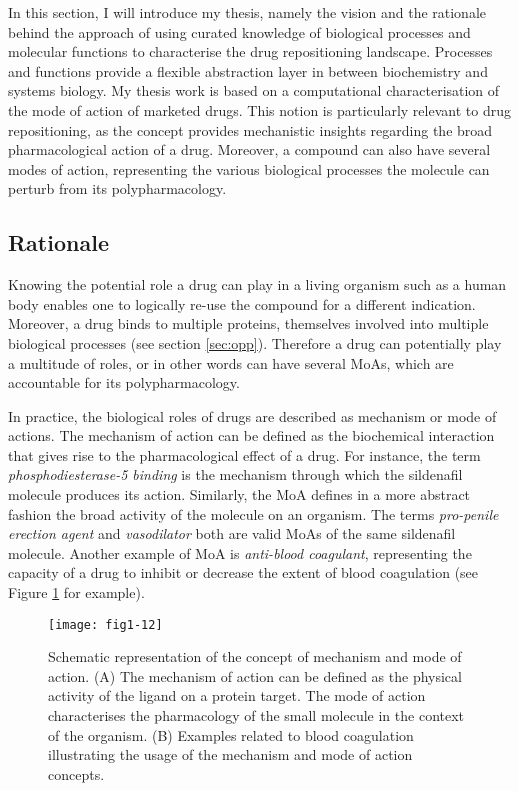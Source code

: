 In this section, I will introduce my thesis, namely the vision and the rationale behind the approach of using curated knowledge of biological processes and molecular functions to characterise the drug repositioning landscape. Processes and functions provide a flexible abstraction layer in between biochemistry and systems biology. My thesis work is based on a computational characterisation of the mode of action of marketed drugs. This notion is particularly relevant to drug repositioning, as the concept provides mechanistic insights regarding the broad pharmacological action of a drug. Moreover, a compound can also have several modes of action, representing the various biological processes the molecule can perturb from its polypharmacology.

\subsection{Rationale}

Knowing the potential role a drug can play in a living organism such as a human body enables one to logically re-use the compound for a different indication. Moreover, a drug binds to multiple proteins, themselves involved into multiple biological processes (see section \ref{sec:opp}). Therefore a drug can potentially play a multitude of roles, or in other words can have several MoAs, which are accountable for its polypharmacology.

In practice, the biological roles of drugs are described as mechanism or mode of actions. The mechanism of action can be defined as the biochemical interaction that gives rise to the pharmacological effect of a drug. For instance, the term \emph{phosphodiesterase-5 binding} is the mechanism through which the sildenafil molecule produces its action. Similarly, the MoA defines in a more abstract fashion the broad activity of the molecule on an organism. The terms \emph{pro-penile erection agent} and \emph{vasodilator} both are valid MoAs of the same sildenafil molecule. Another example of MoA is \emph{anti-blood coagulant}, representing the capacity of a drug to inhibit or decrease the extent of blood coagulation (see Figure \ref{fig1-12} for example).

\begin{figure}[ht]
    \centering
    \texttt{[image: fig1-12]}
    \caption{Schematic representation of the concept of mechanism and mode of action. (A) The mechanism of action can be defined as the physical activity of the ligand on a protein target. The mode of action characterises the pharmacology of the small molecule in the context of the organism. (B) Examples related to blood coagulation illustrating the usage of the mechanism and mode of action concepts.}
    \label{fig1-12}
\end{figure}

